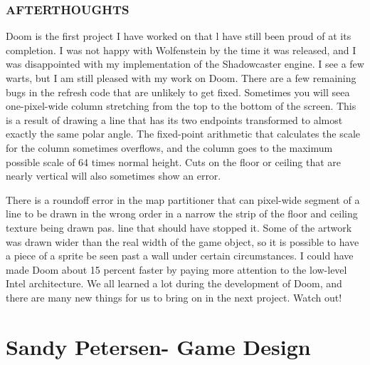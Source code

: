 \subsubsection{AFTERTHOUGHTS}
Doom is the first project I have worked on that l have still been proud of at its completion. I was not happy with Wolfenstein by the time it was released, and I was disappointed with my implementation of the Shadowcaster engine. I see a few warts, but I am still pleased with my work on Doom. There are a few remaining bugs in the refresh code that are unlikely to get fixed. Sometimes you will seea one-pixel-wide column stretching from the top to the bottom of the screen. This is a result of drawing a line that has its two endpoints transformed to almost exactly the same polar angle. The fixed-point arithmetic that calculates the scale for the column sometimes overflows, and the column goes to the maximum possible scale of 64 times normal height. Cuts on the floor or ceiling that are nearly vertical will also sometimes show an error.\\
\par

There is a roundoff error in the map partitioner that can pixel-wide segment of a line to be drawn in the wrong order in a narrow the strip of the floor and ceiling texture being drawn pas.
line that should have stopped it. Some of the artwork was drawn wider than the real width of the game object, so it is possible to have a piece of a sprite be seen past a wall under certain circumstances. I could have made Doom about 15 percent faster by paying more attention to the low-level Intel architecture. We all learned a lot during the development of Doom, and there are many new things for us to bring on in the next project. Watch out!





\section{Sandy Petersen- Game Design}


